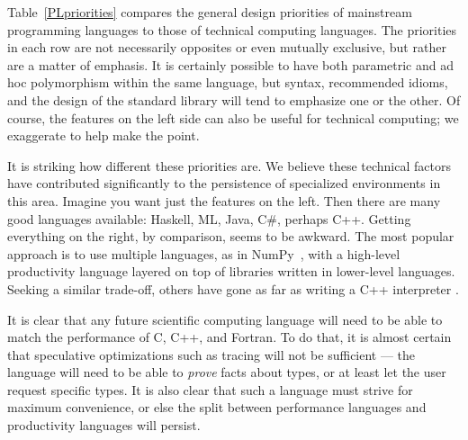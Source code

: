 Table~\ref{PLpriorities} compares the general design priorities of mainstream
programming languages to those of technical computing languages.
The priorities in each row are not necessarily opposites or even mutually exclusive,
but rather are a matter of emphasis.
It is certainly possible to have both parametric and ad hoc polymorphism within
the same language, but syntax, recommended idioms, and the design of the standard
library will tend to emphasize one or the other.
Of course, the features on the left side can also be useful for technical computing;
we exaggerate to help make the point.

It is striking how different these priorities are.
We believe these technical factors have contributed significantly to the persistence
of specialized environments in this area.
Imagine you want just the features on the left.
Then there are many good languages available: Haskell, ML, Java, C\#, perhaps C++.
Getting everything on the right, by comparison, seems to be awkward.
The most popular approach is to use multiple languages, as in NumPy~\cite{numpy},
with a high-level productivity language layered on top of libraries
written in lower-level languages.
Seeking a similar trade-off, others have gone as far as writing a C++
interpreter \cite{vasilev2012cling}.




It is clear that any future scientific computing language will need to be able to
match the performance of C, C++, and Fortran.
To do that, it is almost certain that speculative optimizations such as tracing
\cite{tracingjit} will not be sufficient ---
the language will need to be able to \emph{prove} facts about types, or at least
let the user request specific types.
It is also clear that such a language must strive for maximum convenience, or else
the split between performance languages and productivity languages will persist.

